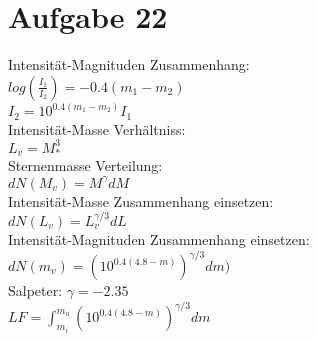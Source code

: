 \section{Aufgabe 22}
Intensität-Magnituden Zusammenhang:\\
$log(\frac{I_1}{I_2}) = -0.4(m_1 - m_2)$\\
$I_2 = 10^{0.4(m_1-m_2)}I_1$ \\
Intensität-Masse Verhältniss:\\
$L_v = M_*^3$\\
Sternenmasse Verteilung:\\
$dN(M_v) = M^\gamma dM$ \\
Intensität-Masse Zusammenhang einsetzen: \\
$dN(L_v) = L_v^{\gamma/3} dL$ \\
Intensität-Magnituden Zusammenhang einsetzen: \\
$dN(m_v) = \left (10^{0.4(4.8 - m)} \right)^{\gamma/3} dm)$ \\
Salpeter: $\gamma = -2.35$\\
$LF  = \int_{m_i}^{m_u} \left (10^{0.4(4.8 - m)} \right)^{\gamma/3} dm$\\
